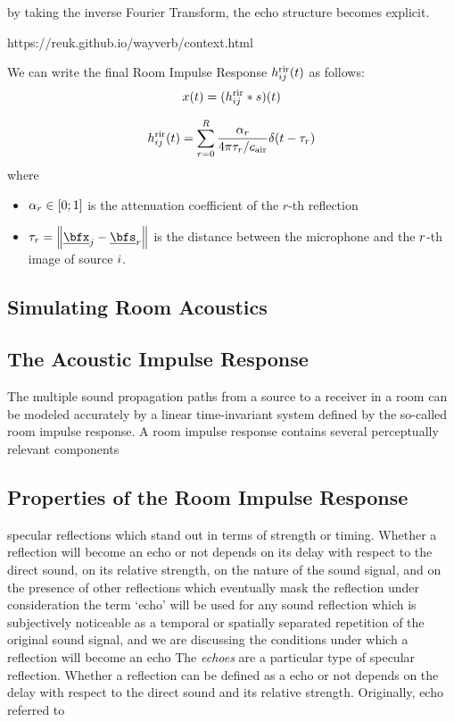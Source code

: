by taking the inverse Fourier Transform, the echo structure becomes explicit.

https://reuk.github.io/wayverb/context.html

We can write the final Room Impulse Response $h^{\text{rir}}_{ij}(t)$ as follows:
\begin{equation}
    x(t) = (h^{\text{rir}}_{ij} \ast s)(t)
\end{equation}

\begin{equation}
    \rir_{ij}(t) = \sum_{r=0}^{R} \frac{\alpha_r}{4 \pi \tau_r / \cair} \delta \kparen{t - \tau_r}
\end{equation}
where
\begin{itemize}
    \item $\alpha_r \in \kintervcc{0}{1}$ is the attenuation coefficient of the $r$-th reflection
    \item $\tau_r = \norm{\positionMicrophone_\idxMic - \positionSource_\idxEch}$ is the distance between the microphone and the $r$-th image of source $i$.
\end{itemize}

\subsection{Simulating Room Acoustics}

\subsection{The Acoustic Impulse Response}
The multiple sound propagation paths from a source to a receiver in a room can be
modeled accurately by a linear time-invariant system defined by the so-called room impulse response.
A room impulse response contains several perceptually relevant components


\subsection{Properties of the Room Impulse Response}
 specular reflections which stand out in terms of strength or timing.
Whether a reflection will become an echo or not depends on its delay with respect to the direct sound, on its relative strength, on the nature of the sound signal, and on the presence of other reflections which eventually mask the reflection under consideration
the term ‘echo’ will be used for any sound reflection which
is subjectively noticeable as a temporal or spatially separated repetition of the original sound signal, and we are discussing the conditions under which a reflection will become an echo
The \textit{echoes} are a particular type of specular reflection.
Whether a reflection can be defined as a echo or not depends
on the delay with respect to the direct sound and its relative strength.
Originally, echo referred to

